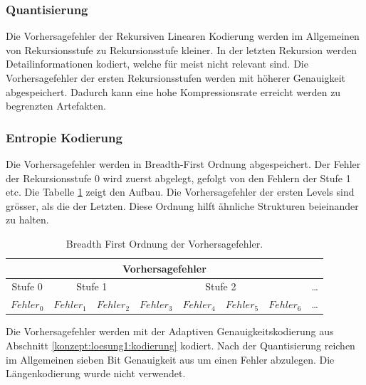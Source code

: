 \subsubsection{Quantisierung} \label{konzept:loesung2:resudial_quant}
Die Vorhersagefehler der Rekursiven Linearen Kodierung werden im Allgemeinen von Rekursionsstufe zu Rekursionsstufe kleiner. In der letzten Rekursion werden Detailinformationen kodiert, welche für meist nicht relevant sind. Die Vorhersagefehler der ersten Rekursionsstufen werden mit höherer Genauigkeit abgespeichert. Dadurch kann eine hohe Kompressionsrate erreicht werden zu begrenzten Artefakten.

\subsubsection{Entropie Kodierung}
Die Vorhersagefehler werden in Breadth-First Ordnung abgespeichert. Der Fehler der Rekursionsstufe 0 wird zuerst abgelegt, gefolgt von den Fehlern der Stufe 1 etc. Die Tabelle \ref{konzept:loesung2:entropie:breath} zeigt den Aufbau. Die Vorhersagefehler der ersten Levels sind grösser, als die der Letzten. Diese Ordnung hilft ähnliche Strukturen beieinander zu halten.

\begin{table}[!htbp]
	\center
	\begin{tabular}{|c||c|c||c|c|c|c||c}
		\hline
		\multicolumn{8}{|c|}{Vorhersagefehler}\\\hline\hline
		 Stufe 0& \multicolumn{2}{|c||}{Stufe 1} & \multicolumn{4}{|c||}{Stufe 2} &\ldots \\\hline
		$Fehler_0$ & $Fehler_1$ &$Fehler_2$ &$Fehler_3$ & $Fehler_4$ & $Fehler_5$ & $Fehler_6$   & \ldots \\\hline
	\end{tabular}
	\caption{Breadth First Ordnung der Vorhersagefehler.}
	\label{konzept:loesung2:entropie:breath}
\end{table}
Die Vorhersagefehler werden mit der Adaptiven Genauigkeitskodierung aus Abschnitt \ref{konzept:loesung1:kodierung} kodiert. Nach der Quantisierung reichen im Allgemeinen sieben Bit Genauigkeit aus um einen Fehler abzulegen. Die Längenkodierung wurde nicht verwendet.